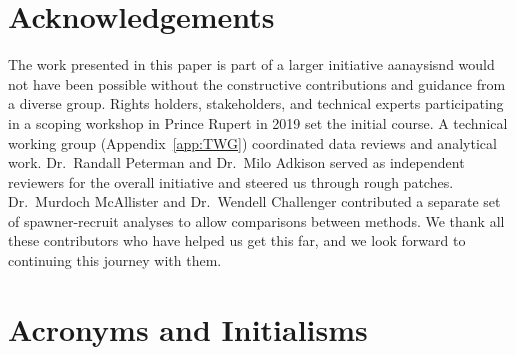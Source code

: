 \documentclass[french,11pt]{book}
\begin{document}
\renewcommand{\tablename}{Tableau}
\frontmatter

\section*{Acknowledgements}\label{acknowledgements}

The work presented in this paper is part of a larger initiative aanaysisnd would not have been possible without the constructive contributions and guidance from a diverse group. Rights holders, stakeholders, and technical experts participating in a scoping workshop in Prince Rupert in 2019 set the initial course. A technical working group (Appendix~\ref{app:TWG}) coordinated data reviews and analytical work. Dr.~Randall Peterman and Dr.~Milo Adkison served as independent reviewers for the overall initiative and steered us through rough patches. Dr.~Murdoch McAllister and Dr.~Wendell Challenger contributed a separate set of spawner-recruit analyses to allow comparisons between methods. We thank all these contributors who have helped us get this far, and we look forward to continuing this journey with them.

\section*{Acronyms and Initialisms}\label{acronyms-and-initialisms}
\end{document}
